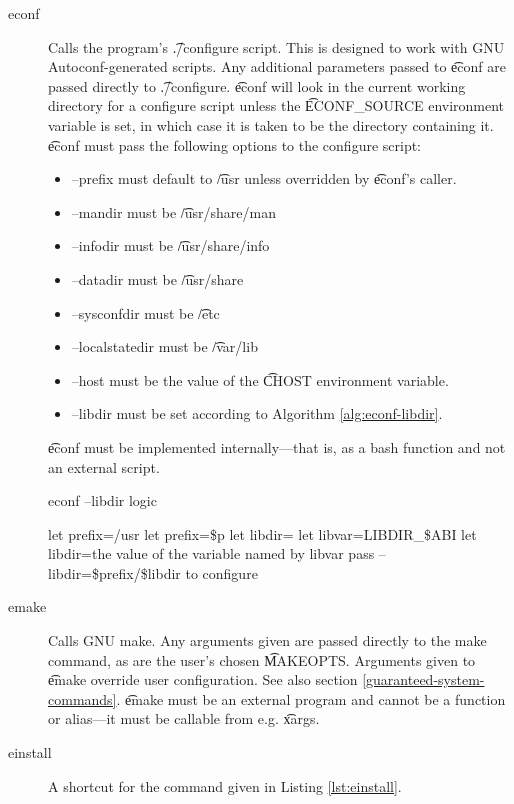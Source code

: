 \begin{description}
\item[econf] Calls the program's \t{./configure} script. This is designed to work with GNU
    Autoconf-generated scripts. Any additional parameters passed to \t{econf} are passed directly
    to \t{./configure}. \t{econf} will look in the current working directory for a configure script
    unless the \t{ECONF\_SOURCE} environment variable is set, in which case it is taken to be the
    directory containing it. \t{econf} must pass the following options to the configure script:
    \begin{itemize}
    \item --prefix must default to \t{/usr} unless overridden by \t{econf}'s caller.
    \item --mandir must be \t{/usr/share/man}
    \item --infodir must be \t{/usr/share/info}
    \item --datadir must be \t{/usr/share}
    \item --sysconfdir must be \t{/etc}
    \item --localstatedir must be \t{/var/lib}
    \item --host must be the value of the \t{CHOST} environment variable.
    \item --libdir must be set according to Algorithm \ref{alg:econf-libdir}.
    \end{itemize}

    \t{econf} must be implemented internally---that is, as a bash function and not an external
    script.

\begin{algorithm}
\caption{econf --libdir logic} \label{alg:econf-libdir}
\begin{algorithmic}[1]
\STATE let prefix=/usr
    \STATE let prefix=\$p
\ENDIF
\STATE let libdir=
    \STATE let libvar=LIBDIR\_\$ABI
        \STATE let libdir=the value of the variable named by libvar
    \ENDIF
\ENDIF
{}
    \STATE pass --libdir=\$prefix/\$libdir to configure
\ENDIF
\end{algorithmic}
\end{algorithm}

\item[emake] Calls GNU make. Any arguments given are passed directly to the make
    command, as are the user's chosen \t{MAKEOPTS}. Arguments given to \t{emake} override user
    configuration. See also section \ref{guaranteed-system-commands}. \t{emake} must be an external
    program and cannot be a function or alias---it must be callable from e.g. \t{xargs}.
\item[einstall] A shortcut for the command given in Listing \ref{lst:einstall}.


\end{description}
